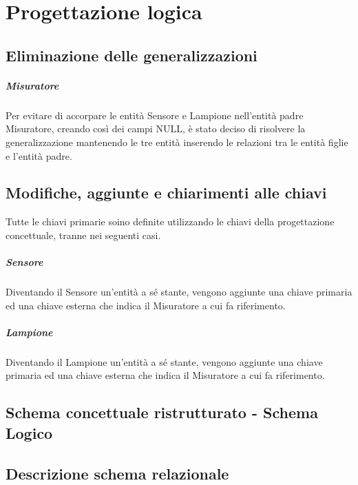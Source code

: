 \chapter{Progettazione logica}

\section{Eliminazione delle generalizzazioni}

\paragraph{Misuratore}

Per evitare di accorpare le entità Sensore e Lampione nell'entità padre Misuratore, creando così dei campi NULL, è stato deciso di risolvere la generalizzazione mantenendo le tre entità inserendo le relazioni tra le entità figlie e l'entità padre.

\section{Modifiche, aggiunte e chiarimenti alle chiavi}

Tutte le chiavi primarie soino definite utilizzando le chiavi della progettazione concettuale, tranne nei seguenti casi.

\paragraph{Sensore} Diventando il Sensore un'entità a sé stante, vengono aggiunte una chiave primaria ed una chiave esterna che indica il Misuratore a cui fa riferimento.

\paragraph{Lampione} Diventando il Lampione un'entità a sé stante, vengono aggiunte una chiave primaria ed una chiave esterna che indica il Misuratore a cui fa riferimento.

\section{Schema concettuale ristrutturato - Schema Logico}


\section{Descrizione schema relazionale}

